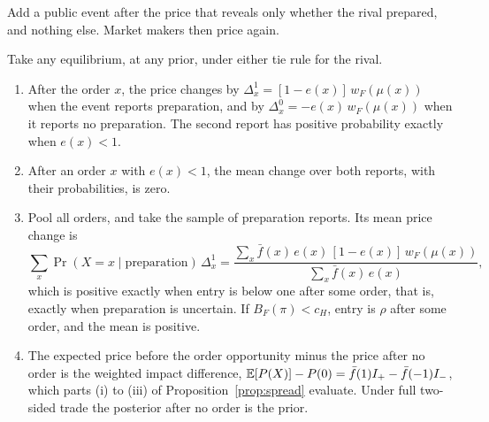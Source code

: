 Add a public event after the price that reveals only whether the rival prepared, and nothing else. Market makers
then price again.

\begin{proposition}\label{prop:announcement}
Take any equilibrium, at any prior, under either tie rule for the rival.
\begin{enumerate}[label=(\roman*),leftmargin=2em]
\item After the order \(x\), the price changes by \(\Delta^1_x=[1-e(x)]\,w_F(\mu(x))\) when the event reports
preparation, and by \(\Delta^0_x=-e(x)\,w_F(\mu(x))\) when it reports no preparation. The second report has positive
probability exactly when \(e(x)<1\).
\item After an order \(x\) with \(e(x)<1\), the mean change over both reports, with their probabilities, is zero.
\item Pool all orders, and take the sample of preparation reports. Its mean price change is
\[
\sum_x\Pr(X=x\mid\text{preparation})\,\Delta^1_x
=\frac{\sum_x\bar f(x)\,e(x)\,[1-e(x)]\,w_F(\mu(x))}{\sum_x\bar f(x)\,e(x)},
\]
which is positive exactly when entry is below one after some order, that is, exactly when preparation is uncertain.
If \(B_F(\pi)<c_H\), entry is \(\rho\) after some order, and the mean is positive.
\item The expected price before the order opportunity minus the price after no order is the weighted impact
difference, \(\mathbb{E}[P(X)]-P(0)=\bar f(1)I_+-\bar f(-1)I_-\), which parts (i) to (iii) of Proposition~\ref{prop:spread}
evaluate. Under full two-sided trade the posterior after no order is the prior.
\end{enumerate}
\end{proposition}

